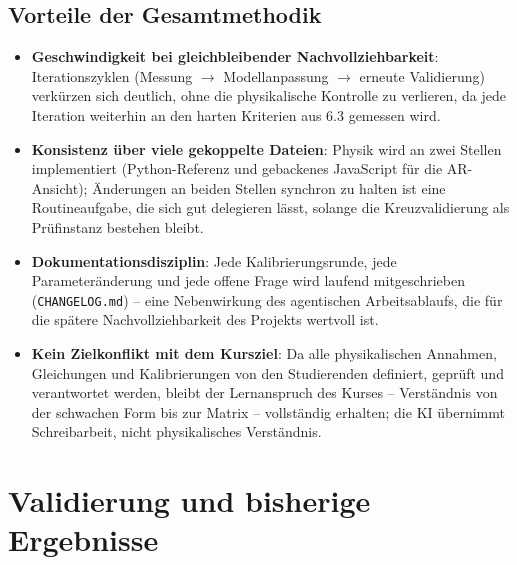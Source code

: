 \documentclass[a4paper,11pt]{article}
\begin{document}
\subsection{Vorteile der Gesamtmethodik}
\begin{itemize}[nosep]
  \item \textbf{Geschwindigkeit bei gleichbleibender Nachvollziehbarkeit}:
        Iterationszyklen (Messung $\to$ Modellanpassung $\to$ erneute
        Validierung) verkürzen sich deutlich, ohne die physikalische
        Kontrolle zu verlieren, da jede Iteration weiterhin an den harten
        Kriterien aus 6.3 gemessen wird.
  \item \textbf{Konsistenz über viele gekoppelte Dateien}: Physik wird an
        zwei Stellen implementiert (Python-Referenz und gebackenes
        JavaScript für die AR-Ansicht); Änderungen an beiden Stellen
        synchron zu halten ist eine Routineaufgabe, die sich gut delegieren
        lässt, solange die Kreuzvalidierung als Prüfinstanz bestehen bleibt.
  \item \textbf{Dokumentationsdisziplin}: Jede Kalibrierungsrunde,
        jede Parameteränderung und jede offene Frage wird laufend
        mitgeschrieben (\texttt{CHANGELOG.md}) -- eine Nebenwirkung des
        agentischen Arbeitsablaufs, die für die spätere Nachvollziehbarkeit
        des Projekts wertvoll ist.
  \item \textbf{Kein Zielkonflikt mit dem Kursziel}: Da alle physikalischen
        Annahmen, Gleichungen und Kalibrierungen von den Studierenden
        definiert, geprüft und verantwortet werden, bleibt der
        Lernanspruch des Kurses -- Verständnis von der schwachen Form bis
        zur Matrix -- vollständig erhalten; die KI übernimmt Schreibarbeit,
        nicht physikalisches Verständnis.
\end{itemize}

\section{Validierung und bisherige Ergebnisse}
\end{document}
